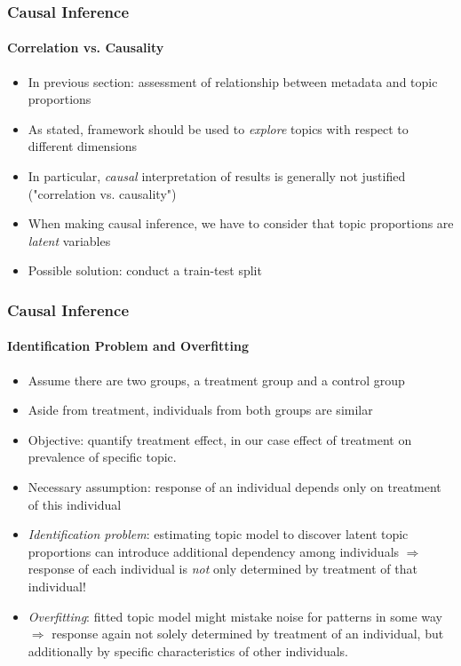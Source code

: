 \documentclass[xcolor=dvipsnames]{beamer}
\begin{document}
\begin{frame}
\begin{figure}[h!]
\begin{subfigure}[b]{0.4\linewidth}
  \end{subfigure}
\end{figure}
\end{frame}

\begin{frame}
\frametitle{Causal Inference}
\framesubtitle{Correlation vs. Causality}
\begin{itemize}
\item In previous section: assessment of relationship between metadata and topic proportions
\item As stated, framework should be used to \textit{explore} topics with respect to different dimensions
\item In particular, \textit{causal} interpretation of results is generally not justified ("correlation vs. causality")
\item When making causal inference, we have to consider that topic proportions are \textit{latent} variables 
\item Possible solution: conduct a train-test split
\end{itemize}
\end{frame}

\begin{frame}
\frametitle{Causal Inference}
\framesubtitle{Identification Problem and Overfitting}
\begin{itemize}
\item Assume there are two groups, a treatment group and a control group
\item Aside from treatment, individuals from both groups are similar
\item Objective: quantify treatment effect, in our case effect of treatment on prevalence of specific topic.
\item Necessary assumption: response of an individual depends only on treatment of this individual
\item \textit{Identification problem}: estimating topic model to discover latent topic proportions can introduce additional dependency among individuals $\Rightarrow$ response of each individual is \textit{not} only determined by treatment of that individual!
\item \textit{Overfitting}: fitted topic model might mistake noise for patterns in some way $\Rightarrow$ response again not solely determined by treatment of an individual, but additionally by specific characteristics of other individuals.
\end{itemize}
\end{frame}
\end{document}
